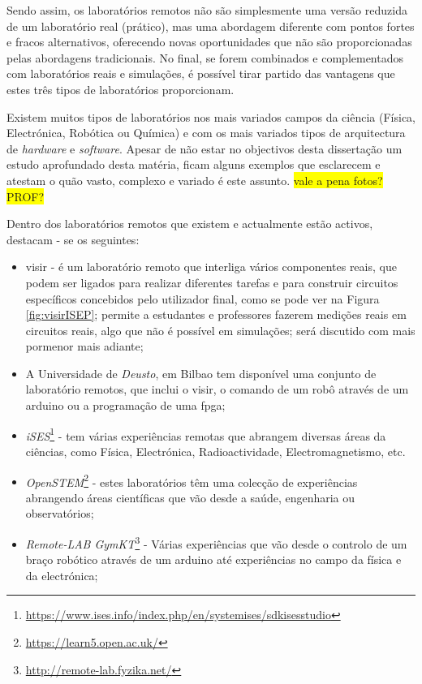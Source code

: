 Sendo assim, os laboratórios remotos não são simplesmente uma versão reduzida de um laboratório real (prático), mas uma abordagem diferente com pontos fortes e fracos alternativos, oferecendo novas oportunidades que não são proporcionadas pelas abordagens tradicionais. No final, se forem combinados e complementados com laboratórios reais e simulações, é possível tirar partido das vantagens que estes três tipos de laboratórios proporcionam.

Existem muitos tipos de laboratórios nos mais variados campos da ciência (Física, Electrónica, Robótica ou Química) e com os mais variados tipos de arquitectura de \textit{hardware} e \textit{software}. Apesar de não estar no objectivos desta dissertação um estudo aprofundado desta matéria, ficam alguns exemplos que esclarecem e atestam o quão vasto, complexo e variado é este assunto.
\colorbox{yellow}{vale a pena fotos? PROF?}

Dentro dos laboratórios remotos que existem e actualmente estão activos, destacam - se os seguintes:
\begin{itemize}
    \item \acrshort{visir} - é um \acrshort{laboratório remoto} que interliga vários componentes reais, que podem ser ligados para realizar diferentes tarefas e para construir circuitos específicos concebidos pelo utilizador final, como se pode ver na Figura \ref{fig:visirISEP}; permite a estudantes e professores fazerem medições reais em circuitos reais, algo que não é possível em simulações; será discutido com mais pormenor mais adiante; 
    \item A Universidade de \textit{Deusto}, em Bilbao tem disponível uma conjunto de \acrshort{laboratório remoto}s, que inclui o \acrshort{visir}, o comando de um robô através de um \gls{arduino} ou a programação de uma \acrfull{fpga};
    \item \textit{iSES}\footnote{\url{https://www.ises.info/index.php/en/systemises/sdkisesstudio}} - tem várias experiências remotas que abrangem diversas áreas da ciências, como Física, Electrónica, Radioactividade, Electromagnetismo, etc.
    \item \textit{OpenSTEM}\footnote{\url{https://learn5.open.ac.uk/}} - estes laboratórios têm uma colecção de experiências abrangendo áreas científicas que vão desde a saúde, engenharia ou observatórios;
    \item \textit{Remote-LAB GymKT}\footnote{\url{http://remote-lab.fyzika.net/}} - Várias experiências que vão desde o controlo de um braço robótico através de um \gls{arduino} até experiências no campo da física e da electrónica;  
\end{itemize}

